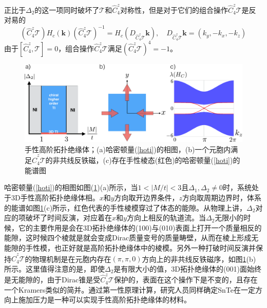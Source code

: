  正比于$\Delta_2$的这一项同时破坏了$\mathcal{T}$和$\hat{C}_4^z$对称性，但是对于它们的组合操作$\hat{C}_4^z\mathcal{T}$是反对易的
\begin{equation}
(\hat{C}_4^z\mathcal{T})H_c(\mathbf{k})(\hat{C}_4^z\mathcal{T})^{-1}=H_c(D_{\hat{C}_4^z\mathcal{T}}\mathbf{k}),\quad D_{\hat{C}_4^z\mathcal{T}}\mathbf{k}=(k_y,-k_x,-k_z)
\end{equation}
由于$\left[\hat{C}_4^z,\mathcal{T}\right]=0$，组合操作$\hat{C}_4^z\mathcal{T}$满足$(\hat{C}_4^z\mathcal{T})^4=-1$。
\begin{figure}[h]
\centering
\includegraphics[scale=0.7]{pic/fig7}
\caption{手性高阶拓扑绝缘体；(a)哈密顿量(\ref{hoti})的相图，(b)一个元胞内满足$\hat{C}_4^z\mathcal{T}$的非共线反铁磁，(c)存在手性棱态(红色)的哈密顿量(\ref{hoti})的能谱图}\label{fig7}
\end{figure}
哈密顿量(\ref{hoti})的相图如图(\ref{fig7})(a)所示，当$1<|M/t|<3$且$\Delta_1,\Delta_2\neq 0$时，系统处于3D手性高阶拓扑绝缘体相。$x$和$y$方向取开边界条件，$z$方向取周期边界时，体系的能谱如图\ref{fig7}(c)所示，红色代表的手性棱模穿过了体态的能隙。从物理上讲，$\Delta_2$对应的项破坏了时间反演，对应着在$x$和$y$方向上相反的轨道流。当$\Delta_2$无限小的时候，它的主要作用是会在3D拓扑绝缘体的(100)与(010)表面上打开一个质量相反的能隙，这时候四个棱就是就会变成Dirac质量变号的质量畴壁，从而在棱上形成无能隙的手性模，也正好就是高阶拓扑绝缘体中的棱模。另外一种打破时间反演并保持$\hat{C}_4^z\mathcal{T}$的物理机制是在元胞内存在$(\pi,\pi,0)$方向上的非共线反铁磁序，如图\ref{fig7}(b)所示。这里值得注意的是，即使$\Delta_2$是有限大小的值，3D拓扑绝缘体的(001)面始终是无能隙的，由于Dirac锥是受$\hat{C}_4^z\mathcal{T}$保护的，表面在这个操作下是不变的，且存在一个Kramers类似的简并。通过第一性原理计算，研究人员同样确定SnTe在一定方向上施加压力是一种可以实现手性高阶拓扑绝缘体的材料\cite{re23}。
